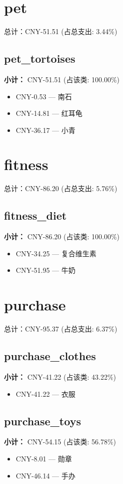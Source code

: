 \documentclass[12pt]{article}
\begin{document}
\section*{pet}
总计：CNY-51.51 	 (占总支出: 3.44\%)

\subsection*{pet\_tortoises}
\textbf{小计：} CNY-51.51 (占该类: 100.00\%)
\begin{itemize}
    \item CNY-0.53 --- 南石
    \item CNY-14.81 --- 红耳龟
    \item CNY-36.17 --- 小青
\end{itemize}
\section*{fitness}
总计：CNY-86.20 	 (占总支出: 5.76\%)

\subsection*{fitness\_diet}
\textbf{小计：} CNY-86.20 (占该类: 100.00\%)
\begin{itemize}
    \item CNY-34.25 --- 复合维生素
    \item CNY-51.95 --- 牛奶
\end{itemize}
\section*{purchase}
总计：CNY-95.37 	 (占总支出: 6.37\%)

\subsection*{purchase\_clothes}
\textbf{小计：} CNY-41.22 (占该类: 43.22\%)
\begin{itemize}
    \item CNY-41.22 --- 衣服
\end{itemize}
\subsection*{purchase\_toys}
\textbf{小计：} CNY-54.15 (占该类: 56.78\%)
\begin{itemize}
    \item CNY-8.01 --- 勋章
    \item CNY-46.14 --- 手办
\end{itemize}
\end{document}
